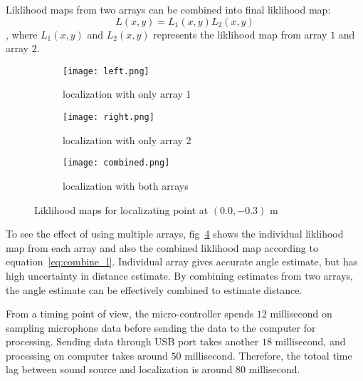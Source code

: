Liklihood maps from two arrays can be combined into final liklihood map:
\begin{equation}\label{eq:combine_l}
L(x,y) = L_1(x,y) L_2(x,y)
\end{equation}
, where $L_1(x,y)$ and $L_2(x,y)$ represents the liklihood map from array $1$ and array $2$.

\begin{figure}[]
  \centering
  \begin{subfigure}[]{.15\textwidth}
    \texttt{[image: left.png]}
    \caption{localization with only array 1}
    \label{fig:liklihood1}
  \end{subfigure}
  \begin{subfigure}[]{.15\textwidth}
    \texttt{[image: right.png]}
    \caption{localization with only array 2}
    \label{fig:liklihood2}
  \end{subfigure}
  \begin{subfigure}[]{.15\textwidth}
    \texttt{[image: combined.png]}
    \caption{localization with both arrays}
    \label{fig:liklihood3}
  \end{subfigure}
  \caption{Liklihood maps for localizating point at $(0.0,-0.3)$ m}
  \label{fig:liklihood}
\end{figure}


To see the effect of using multiple arrays, fig~\ref{fig:liklihood} shows the individual liklihood map from each array and also the combined liklihood map according to equation~\ref{eq:combine_l}. Individual array gives accurate angle estimate, but has high uncertainty in distance estimate. By combining estimates from two arrays, the angle estimate can be effectively combined to estimate distance.

From a timing point of view, the micro-controller spends $12$ millisecond on sampling microphone data before sending the data to the computer for processing. Sending data through USB port takes another $18$ millisecond, and processing on computer takes around $50$ millisecond. Therefore, the totoal time lag between sound source and localization is around $80$ millisecond.
